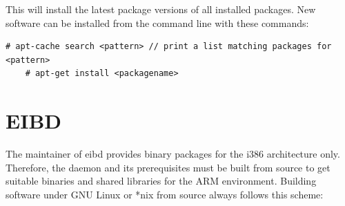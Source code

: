 This will install the latest package versions of all installed packages. New software can be installed from the command line with these commands:

\begin{lstlisting}[style=BashInputStyle]
    # apt-cache search <pattern> // print a list matching packages for <pattern> 
    # apt-get install <packagename>
\end{lstlisting}

\section{EIBD}

The maintainer of \gls{eibd} provides binary packages for the i386 architecture only. Therefore, the daemon and its prerequisites must be built from source to get
suitable binaries and shared libraries for the ARM environment. Building software under GNU Linux or *nix from source always follows this scheme:

